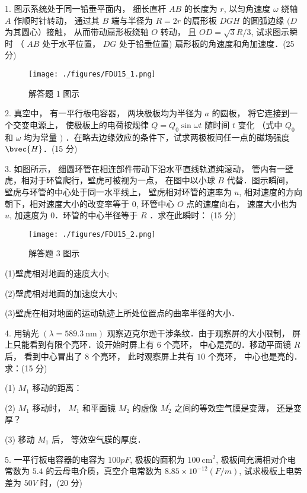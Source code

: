 
1. 图示系统处于同一铅垂平面内， 细长直杆 $A B$ 的长度为 $r$, 以匀角速度 $\omega$ 绕轴 $A$ 作顺时针转动， 通过其 $B$ 端与半径为 $R=2 r$ 的扇形板 $D G H$ 的圆弧边缘 $(D$ 为其圆心）接触， 从而带动扇形板绕轴 $O$ 转动， 且 $O D=\sqrt{3} R / 3$, 试求图示瞬时 （ $A B$ 处于水平位置， $D G$ 处于铅垂位置) 扇形板的角速度和角加速度．(25 分)

\begin{figure}[ht]
\centering
\texttt{[image: ./figures/FDU15\_1.png]}
\caption{解答题 1 图示} \label{FDU15_fig1}
\end{figure}

2. 真空中， 有一平行板电容器， 两块极板均为半径为 $a$ 的圆板， 将它连接到一个交变电源上， 使极板上的电荷按规律 $Q=Q_{0} \sin \omega t$ 随时间 $t$ 变化 （式中 $Q_{0}$ 和 $\omega$ 均为常量 $)$ ．在略去边缘效应的条件下，试求两极板间任一点的磁场强度 $\bvec{H}$．(15 分)

3. 如图所示， 细圆环管在相连部件带动下沿水平直线轨道纯滚动， 管内有一壁虎，相对于环管爬行，壁虎可被视为一点， 在图中以小球 $B$ 代替．图示瞬间， 壁虎与环管的中心处于同一水平线上， 壁虎相对环管的速率为 $u$, 相对速度的方向朝下，相对速度大小的改变率等于 $0$, 环管中心 $O$ 点的速度向右， 速度大小也为 $u$, 加速度为 $0$．环管的中心半径等于 $R$ ．求在此瞬时：
(15 分)

\begin{figure}[ht]
\centering
\texttt{[image: ./figures/FDU15\_2.png]}
\caption{解答题 3 图示} \label{FDU15_fig2}
\end{figure}

(1)壁虎相对地面的速度大小;

(2)壁虎相对地面的加速度大小;

(3)壁虎在相对地面的运动轨迹上所处位置点的曲率半径的大小．

4. 用钠光 $(\lambda=589.3 \mathrm{~nm})$ 观察迈克尔逊干涉条纹．由于观察屏的大小限制， 屏上只能看到有限个亮环．设开始时屏上有 $6$ 个亮环， 中心是亮的．移动平面镜 $R$ 后， 看到中心冒出了 $8$ 个亮环， 此时观察屏上共有 $10$ 个亮环， 中心也是亮的．求：(15 分)

(1) $M_{1}$ 移动的距离：

(2) $M_{1}$ 移动时， $M_{1}$ 和平面镜 $M_{2}$ 的虚像 $M_{2}^{\prime}$ 之间的等效空气膜是变薄， 还是变厚？

(3) 移动 $M_{1}$ 后， 等效空气膜的厚度．

5. 一平行板电容器的电容为 $100 p F$, 极板的面积为 $100 \mathrm{~cm}^{2}$, 极板间充满相对介电常数为 $5.4$ 的云母电介质，真空介电常数为 $8.85 \times 10^{-12}(F / m)$, 试求极板上电势差为 $50 V$ 时，(20 分)


